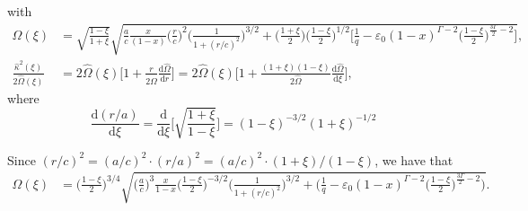 \documentclass[11pt]{article}
\newcommand{\rd}{\mathrm{d}}
\newcommand{\hOmega}{\widehat{\Omega}}
\newcommand{\hkappa}{\widehat{\kappa}}
\begin{document}
with
\begin{align}
\hOmega(\xi) &=\sqrt{\frac{1-\xi}{1+\xi}} \sqrt{\frac{a}{c}\frac{x}{(1-x)}\bigg( \frac{r}{c}\bigg)^2 \bigg(\frac{1}{1+(r/c)^2}\bigg)^{3/2} 
+ \bigg(\frac{1+\xi}{2}\bigg) \bigg(\frac{1-\xi}{2}\bigg)^{1/2}  \bigg[\frac{1}{q}-  \varepsilon_0 (1-x)^{\Gamma-2}\bigg(\frac{1-\xi}{2}\bigg)^{\frac{3\Gamma}{2}-2} \bigg] } ,\\
\frac{\hkappa^2(\xi)}{2\hOmega(\xi)} &= 2\hOmega(\xi) \bigg[1+\frac{r}{2\hOmega}\frac{\rd \hOmega }{\rd r}\bigg] = 2\hOmega(\xi) \bigg[1+\frac{(1+\xi)(1-\xi)}{2\hOmega}\frac{\rd \hOmega }{\rd \xi} \bigg],
\end{align}
where
$$\frac{\rd(r/a)}{\rd \xi} = \frac{\rd}{\rd \xi} \bigg[\sqrt{\frac{1+\xi}{1-\xi}}\bigg] = (1-\xi)^{-3/2}(1+\xi)^{-1/2}$$

Since $(r/c)^2 = (a/c)^2 \cdot (r/a)^2 =  (a/c)^2 \cdot (1+\xi)/(1-\xi)$, we have that
\begin{align}
\hOmega(\xi) &=\bigg(\frac{1-\xi}{2}\bigg)^{3/4}  \sqrt{\bigg( \frac{a}{c}\bigg)^3\frac{x}{1-x} \bigg(\frac{1-\xi}{2}\bigg)^{-3/2} \bigg(\frac{1}{1+(r/c)^2}\bigg)^{3/2} 
+   \bigg(\frac{1}{q}-  \varepsilon_0 (1-x)^{\Gamma-2}\bigg(\frac{1-\xi}{2}\bigg)^{\frac{3\Gamma}{2}-2} \bigg) } .
\end{align}
\end{document}
